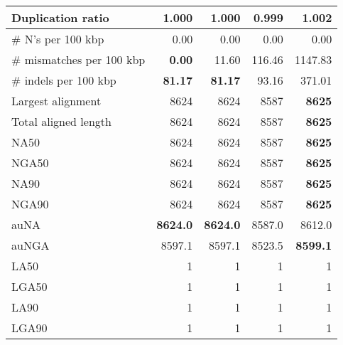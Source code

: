 \documentclass[12pt,a4paper]{article}
\begin{document}
\begin{table}[ht]
\begin{center}
\begin{tabular}{|l*{4}{|r}|}
Duplication ratio & 1.000 & 1.000 & {\bf 0.999} & 1.002 \\ \hline
\# N's per 100 kbp & 0.00 & 0.00 & 0.00 & 0.00 \\ \hline
\# mismatches per 100 kbp & {\bf 0.00} & 11.60 & 116.46 & 1147.83 \\ \hline
\# indels per 100 kbp & {\bf 81.17} & {\bf 81.17} & 93.16 & 371.01 \\ \hline
Largest alignment & 8624 & 8624 & 8587 & {\bf 8625} \\ \hline
Total aligned length & 8624 & 8624 & 8587 & {\bf 8625} \\ \hline
NA50 & 8624 & 8624 & 8587 & {\bf 8625} \\ \hline
NGA50 & 8624 & 8624 & 8587 & {\bf 8625} \\ \hline
NA90 & 8624 & 8624 & 8587 & {\bf 8625} \\ \hline
NGA90 & 8624 & 8624 & 8587 & {\bf 8625} \\ \hline
auNA & {\bf 8624.0} & {\bf 8624.0} & 8587.0 & 8612.0 \\ \hline
auNGA & 8597.1 & 8597.1 & 8523.5 & {\bf 8599.1} \\ \hline
LA50 & 1 & 1 & 1 & 1 \\ \hline
LGA50 & 1 & 1 & 1 & 1 \\ \hline
LA90 & 1 & 1 & 1 & 1 \\ \hline
LGA90 & 1 & 1 & 1 & 1 \\ \hline
\end{tabular}
\end{center}
\end{table}
\end{document}
